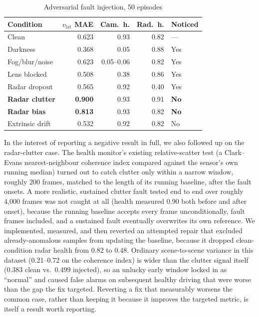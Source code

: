 \documentclass[conference]{IEEEtran}
\begin{document}
\begin{table}[htbp]
\caption{Adversarial fault injection, 50 episodes}
\label{tab:adversarial}
\centering
\begin{tabular}{@{}lrrrl@{}}
\toprule
Condition & $v_{\text{lat}}$ MAE & Cam.\ h. & Rad.\ h. & Noticed \\
\midrule
Clean & 0.623 & 0.93 & 0.82 & --- \\
Darkness & 0.368 & 0.05 & 0.88 & Yes \\
Fog/blur/noise & 0.623 & 0.05--0.06 & 0.82 & Yes \\
Lens blocked & 0.508 & 0.38 & 0.86 & Yes \\
Radar dropout & 0.565 & 0.92 & 0.40 & Yes \\
\textbf{Radar clutter} & \textbf{0.900} & 0.93 & 0.91 & \textbf{No} \\
\textbf{Radar bias} & \textbf{0.813} & 0.93 & 0.82 & \textbf{No} \\
Extrinsic drift & 0.532 & 0.92 & 0.82 & No \\
\bottomrule
\end{tabular}
\end{table}

In the interest of reporting a negative result in full, we also
followed up on the radar-clutter case. The health monitor's existing
relative-scatter test (a Clark--Evans nearest-neighbour coherence index
compared against the sensor's own running median) turned out to catch
clutter only within a narrow window, roughly 200 frames, matched to the
length of its running baseline, after the fault onsets. A more
realistic, sustained clutter fault tested end to end over roughly
4{,}000 frames was not caught at all (health measured 0.90 both before
and after onset), because the running baseline accepts every frame
unconditionally, fault frames included, and a sustained fault
eventually overwrites its own reference. We implemented, measured, and
then reverted an attempted repair that excluded already-anomalous
samples from updating the baseline, because it dropped clean-condition
radar health from 0.82 to 0.48. Ordinary scene-to-scene variance in
this dataset (0.21--0.72 on the coherence index) is wider than the
clutter signal itself (0.383 clean vs.\ 0.499 injected), so an unlucky
early window locked in as ``normal'' and caused false alarms on
subsequent healthy driving that were worse than the gap the fix
targeted. Reverting a fix that measurably worsens the common case,
rather than keeping it because it improves the targeted metric, is
itself a result worth reporting.
\end{document}
